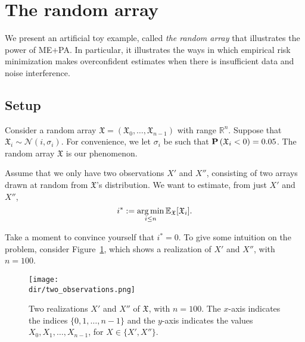 %



%



\section{The random array}
\label{sec:random_array}

We present an artificial toy example, called \emph{the random array} that illustrates the power of ME+PA. In particular, it illustrates the ways in which empirical risk minimization makes overconfident estimates when there is insufficient data and noise interference.

\subsection{Setup}

Consider a random array $\mathfrak{X} = \left(\mathfrak{X}_0, \ldots, \mathfrak{X}_{n-1}\right)$ with range $\mathbb{R}^n$. Suppose that $\mathfrak{X}_i \sim \mathcal{N}\left(i, \sigma_i\right)$. For convenience, we let $\sigma_i$ be such that $\mathbf{P}\left(\mathfrak{X}_i < 0\right) = 0.05$. The random array $\mathfrak{X}$ is our phenomenon. 

Assume that we only have two observations $X'$ and $X''$, consisting of two arrays drawn at random from $\mathfrak{X}$'s distribution. We want to estimate, from just $X'$ and $X''$,
%
\begin{equation}
i^* := \operatorname*{arg\,min}_{i \leq n} \mathbb{E}_{\mathfrak{X}}[\mathfrak{X}_i].
\end{equation}

Take a moment to convince yourself that $i^* = 0$. To give some intuition on the problem, 
consider Figure~\ref{fig:illustration_random_array}, which shows a realization of $X'$ and $X''$, with $n = 100$. 

\begin{figure}[hbtp]
\centering
\texttt{[image: \\dir/two\_observations.png]}
\caption{Two realizations $X'$ and $X''$ of $\mathfrak{X}$, with $n = 100$. The $x$-axis indicates the indices $\{0, 1, \ldots, n-1\}$ and the $y$-axis indicates the values $X_0, X_1, \ldots, X_{n-1}$, for $X \in \{X', X''\}$.}
\label{fig:illustration_random_array}
\end{figure}

